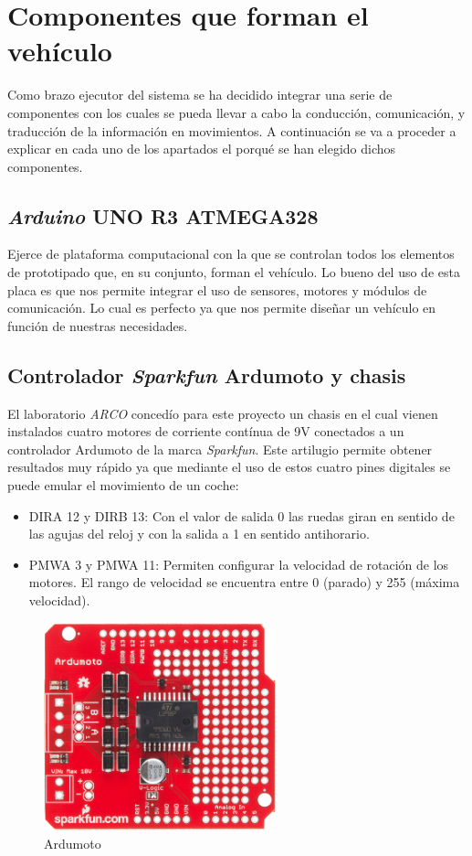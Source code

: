 \chapter{Componentes que forman el vehículo}

Como brazo ejecutor del sistema se ha decidido integrar una serie de componentes con los cuales se pueda llevar a cabo la conducción, comunicación, y traducción de la información en movimientos. A continuación se va a proceder a explicar en cada uno de los apartados el porqué se han elegido dichos componentes.

\section{\emph{Arduino} UNO R3 ATMEGA328}

Ejerce de plataforma computacional con la que se controlan todos los elementos de prototipado que, en su conjunto, forman el vehículo. Lo bueno del uso de esta placa es que nos permite integrar el uso de sensores, motores y módulos de comunicación. Lo cual es perfecto ya que nos permite diseñar un vehículo en función de nuestras necesidades.

\section{Controlador \emph{Sparkfun} Ardumoto y chasis}

El laboratorio \emph{ARCO} concedío para este proyecto un chasis en el cual vienen instalados cuatro motores de corriente contínua de 9V conectados a un  controlador Ardumoto de la marca \emph{Sparkfun}. Este artilugio permite obtener resultados muy rápido ya que mediante el uso de estos cuatro pines digitales se puede emular el movimiento de un coche:

\begin{itemize}
\item DIRA 12 y DIRB 13: Con el valor de salida 0 las ruedas giran en sentido de las agujas del reloj y con la salida a 1 en sentido antihorario.
\item PMWA 3 y PMWA 11: Permiten configurar la velocidad de rotación de los motores. El rango de velocidad se encuentra entre 0 (parado) y 255 (máxima velocidad). 
\end{itemize}

\begin{figure}[hbtp]
 \centering
   \includegraphics[width=0.6\textwidth]{./figures/ardumoto.jpeg}
 \caption{Ardumoto}
 \label{fig:Ardumoto}
\end{figure}

